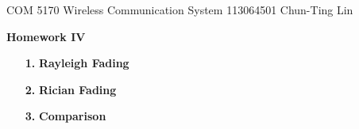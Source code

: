 \documentclass[letterpaper,12pt]{article}
\begin{document}
  \noindent COM 5170 Wireless Communication System \hfill 113064501  Chun-Ting Lin \\

  \begin{center}
    {\bf \large  Homework IV}
  \end{center}


  \begin{enumerate}
    \item[{\bf 1. }]  \textbf{Rayleigh Fading} \hfill \\
      
    \item[{\bf 2. }]  \textbf{Rician Fading} \hfill \\
      
    \item[{\bf 3. }]  \textbf{Comparison} \hfill \\
      
  \end{enumerate}
\end{document}
